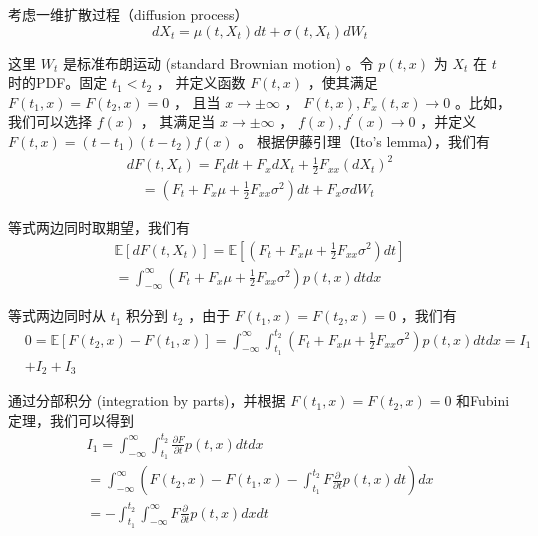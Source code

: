 考虑一维扩散过程（diffusion process）
$$
d X_t=\mu\left(t, X_t\right) d t+\sigma\left(t, X_t\right) d W_t
$$

这里 $W_t$ 是标准布朗运动 (standard Brownian motion) 。令 $p(t, x)$ 为 $X_t$ 在 $t$ 时的PDF。固定 $t_1<t_2$ ，
并定义函数 $F(t, x)$ ，使其满足 $F\left(t_1, x\right)=F\left(t_2, x\right)=0$ ，
且当 $x \rightarrow \pm \infty$ ， $F(t, x), F_x(t, x) \rightarrow 0$ 。比如，我们可以选择 $f(x)$ ，
其满足当 $x \rightarrow \pm \infty$ ，
$f(x), f^{\prime}(x) \rightarrow 0$ ，并定义 $F(t, x)=\left(t-t_1\right)\left(t-t_2\right) f(x)$ 。
根据伊藤引理（Ito's lemma），我们有
$$
\begin{gathered}
d F\left(t, X_t\right)=F_t d t+F_x d X_t+\frac{1}{2} F_{x x}\left(d X_t\right)^2 \\
\quad=\left(F_t+F_x \mu+\frac{1}{2} F_{x x} \sigma^2\right) d t+F_x \sigma d W_t
\end{gathered}
$$

等式两边同时取期望，我们有
$$
\begin{gathered}
\mathbb{E}\left[d F\left(t, X_t\right)\right]=\mathbb{E}\left[\left(F_t+F_x \mu+\frac{1}{2} F_{x x} \sigma^2\right) d t\right] \\
=\int_{-\infty}^{\infty}\left(F_t+F_x \mu+\frac{1}{2} F_{x x} \sigma^2\right) p(t, x) d t d x
\end{gathered}
$$

等式两边同时从 $t_1$ 积分到 $t_2$ ，由于 $F\left(t_1, x\right)=F\left(t_2, x\right)=0$ ，我们有
$$
\begin{aligned}
& 0=\mathbb{E}\left[F\left(t_2, x\right)-F\left(t_1, x\right)\right]=\int_{-\infty}^{\infty}
\int_{t_1}^{t_2}\left(F_t+F_x \mu+\frac{1}{2} F_{x x} \sigma^2\right) p(t, x) d t d x=I_1 \\
& +I_2+I_3
\end{aligned}
$$

通过分部积分 (integration by parts)，并根据 $F\left(t_1, x\right)=F\left(t_2, x\right)=0$ 和Fubini定理，我们可以得到
$$
\begin{gathered}
I_1=\int_{-\infty}^{\infty} \int_{t_1}^{t_2} \frac{\partial F}{\partial t} p(t, x) d t d x \\
=\int_{-\infty}^{\infty}\left(F\left(t_2, x\right)-F\left(t_1, x\right)-\int_{t_1}^{t_2} F
\frac{\partial}{\partial t} p(t, x) d t\right) d x \\
=-\int_{t_1}^{t_2} \int_{-\infty}^{\infty} F \frac{\partial}{\partial t} p(t, x) d x d t
\end{gathered}
$$

